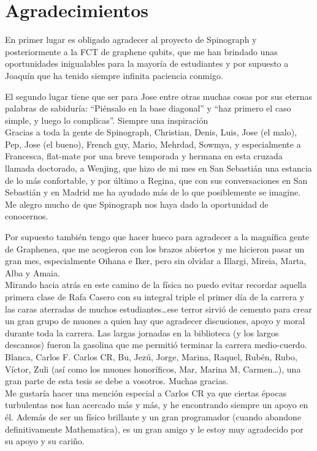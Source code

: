 \chapter*{Agradecimientos}
\thispagestyle{empty}
En primer lugar es obligado agradecer al proyecto de Spinograph y posteriormente a la FCT de graphene qubits, que me han brindado unas oportunidades inigualables para la mayoría de estudiantes y por supuesto a Joaquín que ha tenido siempre infinita paciencia conmigo.


El segundo lugar tiene que ser para Jose entre otras muchas cosas por sus eternas palabras de sabiduría: ``Piénsalo en la base diagonal'' y ``haz primero el caso simple, y luego lo complicas''. Siempre una inspiración\\

Gracias a toda la gente de Spinograph, Christian, Denis, Luis, Jose (el malo), Pep, Jose (el bueno), French guy, Mario, Mehrdad, Sowmya, y especialmente a Francesca, flat-mate por una breve temporada y hermana en esta cruzada llamada doctorado, a Wenjing, que hizo de mi mes en San Sebastián una estancia de lo más confortable, y por último a Regina, que con sus conversaciones en San Sebastián y en Madrid me ha ayudado más de lo que posiblemente se imagine. Me alegro mucho de que Spinograph nos haya dado la oportunidad de conocernos.

Por supuesto también tengo que hacer hueco para agradecer a la magnífica gente de Graphenea, que me acogieron con los brazos abiertos y me hicieron pasar un gran mes, especialmente Oihana e Iker, pero sin olvidar a Illargi, Mireia, Marta, Alba y Amaia.\\


Mirando hacia atrás en este camino de la física no puedo evitar recordar aquella primera clase de Rafa Casero con su integral triple el primer día de la carrera y las caras aterradas de muchos estudiantes\dots ese terror sirvió de cemento para crear un gran grupo de muones a quien hay que agradecer discusiones, apoyo y moral durante toda la carrera.
Las largas jornadas en la biblioteca (y los largos descansos) fueron la gasolina que me permitió terminar la carrera medio-cuerdo. Blanca, Carlos F. Carlos CR, Bu, Jezú, Jorge, Marina, Raquel, Rubén, Rubo, Víctor, Zuli (así como los muones honoríficos, Mar, Marina M, Carmen\dots), una gran parte de esta tesis se debe a vosotros. Muchas gracias.\\

Me gustaría hacer una mención especial a Carlos CR ya que ciertas épocas turbulentas nos han acercado más y más, y he encontrando siempre un apoyo en él. Además de ser un físico brillante y un gran programador (cuando abandone definitivamente Mathematica), es un gran amigo y le estoy muy agradecido por su apoyo y su cariño.\\

